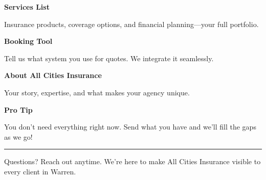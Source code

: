 \documentclass[11pt,letterpaper]{article}
\begin{document}
\begin{minipage}[t]{0.48\textwidth}
\begin{tcolorbox}[colframe=accent-teal, boxrule=1pt, left=0.7em, right=0.7em, top=0.5em, bottom=0.5em, arc=4pt, boxsep=0pt]
{\bfseries\small\color{accent-teal}Services List}

\vspace{0.15em}

{\small Insurance products, coverage options, and financial planning—your full portfolio.}
\end{tcolorbox}

\vspace{0.1em}

\begin{tcolorbox}[colframe=accent-teal, boxrule=1pt, left=0.7em, right=0.7em, top=0.5em, bottom=0.5em, arc=4pt, boxsep=0pt]
{\bfseries\small\color{accent-teal}Booking Tool}

\vspace{0.15em}

{\small Tell us what system you use for quotes. We integrate it seamlessly.}
\end{tcolorbox}

\vspace{0.1em}

\begin{tcolorbox}[colframe=accent-teal, boxrule=1pt, left=0.7em, right=0.7em, top=0.5em, bottom=0.5em, arc=4pt, boxsep=0pt]
{\bfseries\small\color{accent-teal}About All Cities Insurance}

\vspace{0.15em}

{\small Your story, expertise, and what makes your agency unique.}
\end{tcolorbox}

\vspace{-0.2em}
\end{minipage}

\vspace{0.15em}

\begin{tcolorbox}[colback={accent-red!5}, colframe=accent-red!20, boxrule=0.5pt, left=0.7em, right=0.7em, top=0.4em, bottom=0.4em, arc=6pt, boxsep=0pt]

{\bfseries\small\color{accent-red}Pro Tip}

\vspace{0.1em}

{\small You don't need everything right now. Send what you have and we'll fill the gaps as we go!}

\end{tcolorbox}

\vspace{0.15em}

\noindent\hrule
\vspace{0.2em}

{\small\color{text-light}Questions? Reach out anytime. We're here to make All Cities Insurance visible to every client in Warren.}
\end{document}
